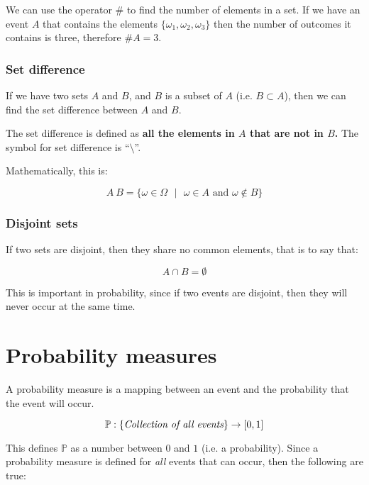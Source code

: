 We can use the operator $\#$ to find the number of elements in a set. If we have
an event $A$ that contains the elements $\{\omega_1, \omega_2, \omega_3\}$ then
the number of outcomes it contains is three, therefore $\#A = 3$.

\subsubsection{Set difference}

If we have two sets $A$ and $B$, and $B$ is a subset of $A$ (i.e. $B \subset
A$), then we can find the set difference between $A$ and $B$.

The set difference is defined as {\bf all the elements in $A$ that are not in
$B$.} The symbol for set difference is ``$\setminus$''.

Mathematically, this is:

\begin{dmath}
	{A \ B = \{\omega \in \Omega \textrm{ } \vert \textrm{ } \omega \in A \textrm{ and } \omega \not\in B\}}
\end{dmath}

\subsubsection{Disjoint sets}

If two sets are disjoint, then they share no common elements, that is to say
that:

\begin{dmath}
	A \cap B = \emptyset
\end{dmath}

This is important in probability, since if two events are disjoint, then they
will never occur at the same time.

\section{Probability measures}

A probability measure is a mapping between an event and the probability that the
event will occur.

\begin{dmath}
	\mathbb{P} : \{\textrm{\it Collection of all events}\} \rightarrow [0,1]
\end{dmath}

This defines $\mathbb{P}$ as a number between $0$ and $1$ (i.e. a probability).
Since a probability measure is defined for {\it all} events that can occur, then
the following are true:

